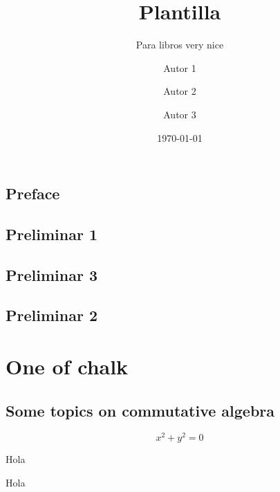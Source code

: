 \documentclass[draft]{qx-files/qx-book}
\title{Plantilla}
\author{Autor 1 \and Autor 2 \and Autor 3}
\date{\today}
\subtitle{Para libros very nice}
\begin{document}
\MakeBookCover

\frontmatter


\maketitle





\chapter*{Preface}

\lipsum[1]




\tableofcontents

\chapter{Preliminar 1}
\lipsum

\chapter{Preliminar 3}
\lipsum

\chapter{Preliminar 2}
\lipsum

\mainmatter

\part{One of chalk}


\chapter[Álgebra conmutativa]{Some topics on commutative algebra}
\lipsum[1-20]
\begin{equation}
  x^2 + y^2 = 0
\end{equation}

\begin{theorem}
  Hola
\end{theorem}



\lipsum[1]

\begin{theorem}
  Hola
\end{theorem}
\end{document}
